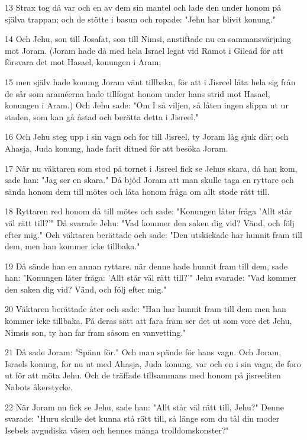 \par 13 Strax tog då var och en av dem sin mantel och lade den under honom på själva trappan; och de stötte i basun och ropade: "Jehu har blivit konung."
\par 14 Och Jehu, son till Josafat, son till Nimsi, anstiftade nu en sammansvärjning mot Joram. (Joram hade då med hela Israel legat vid Ramot i Gilead för att försvara det mot Hasael, konungen i Aram;
\par 15 men själv hade konung Joram vänt tillbaka, för att i Jisreel låta hela sig från de sår som araméerna hade tillfogat honom under hans strid mot Hasael, konungen i Aram.) Och Jehu sade: "Om I så viljen, så låten ingen slippa ut ur staden, som kan gå åstad och berätta detta i Jisreel."
\par 16 Och Jehu steg upp i sin vagn och for till Jisreel, ty Joram låg sjuk där; och Ahasja, Juda konung, hade farit ditned för att besöka Joram.
\par 17 När nu väktaren som stod på tornet i Jisreel fick se Jehus skara, då han kom, sade han: "Jag ser en skara." Då bjöd Joram att man skulle taga en ryttare och sända honom dem till mötes och låta honom fråga om allt stode rätt till.
\par 18 Ryttaren red honom då till mötes och sade: "Konungen låter fråga 'Allt står väl rätt till?'" Då svarade Jehu: "Vad kommer den saken dig vid? Vänd, och följ efter mig." Och väktaren berättade och sade: "Den utskickade har hunnit fram till dem, men han kommer icke tillbaka."
\par 19 Då sände han en annan ryttare. när denne hade hunnit fram till dem, sade han: "Konungen låter fråga: 'Allt står väl rätt till?'" Jehu svarade: "Vad kommer den saken dig vid? Vänd, och följ efter mig."
\par 20 Väktaren berättade åter och sade: "Han har hunnit fram till dem men han kommer icke tillbaka. På deras sätt att fara fram ser det ut som vore det Jehu, Nimsis son, ty han far fram såsom en vanvetting."
\par 21 Då sade Joram: "Spänn för." Och man spände för hans vagn. Och Joram, Israels konung, for nu ut med Ahasja, Juda konung, var och en i sin vagn; de foro ut för att möta Jehu. Och de träffade tillsammans med honom på jisreeliten Nabots åkerstycke.
\par 22 När Joram nu fick se Jehu, sade han: "Allt står väl rätt till, Jehu?" Denne svarade: "Huru skulle det kunna stå rätt till, så länge som du tål din moder Isebels avgudiska väsen och hennes många trolldomskonster?"
